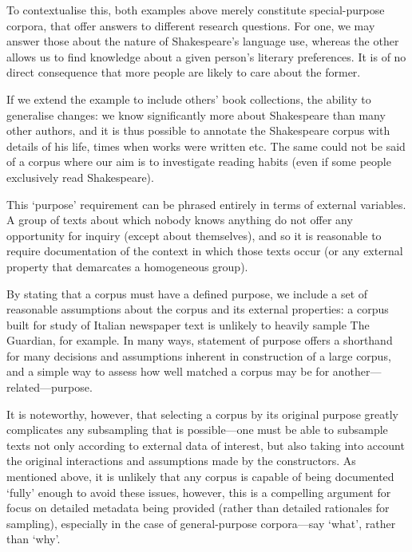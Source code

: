 To contextualise this, both examples above merely constitute special-purpose corpora, that offer answers to different research questions.  For one, we may answer those about the nature of Shakespeare's language use, whereas the other allows us to find knowledge about a given person's literary preferences.  It is of no direct consequence that more people are likely to care about the former.

If we extend the example to include others' book collections, the ability to generalise changes: we know significantly more about Shakespeare than many other authors, and it is thus possible to annotate the Shakespeare corpus with details of his life, times when works were written etc.  The same could not be said of a corpus where our aim is to investigate reading habits (even if some people exclusively read Shakespeare).

This `purpose' requirement can be phrased entirely in terms of external variables.
A group of texts about which nobody knows anything do not offer any opportunity for inquiry (except about themselves), and so it is reasonable to require documentation of the context in which those texts occur (or any external property that demarcates a homogeneous group).

By stating that a corpus must have a defined purpose, we include a set of reasonable assumptions about the corpus and its external properties: a corpus built for study of Italian newspaper text is unlikely to heavily sample The Guardian, for example.  In many ways, statement of purpose offers a shorthand for many decisions and assumptions inherent in construction of a large corpus, and a simple way to assess how well matched a corpus may be for another---related---purpose.

It is noteworthy, however, that selecting a corpus by its original purpose greatly complicates any subsampling that is possible---one must be able to subsample texts not only according to external data of interest, but also taking into account the original interactions and assumptions made by the constructors.  As mentioned above, it is unlikely that any corpus is capable of being documented `fully' enough to avoid these issues, however, this is a compelling argument for focus on detailed metadata being provided (rather than detailed rationales for sampling), especially in the case of general-purpose corpora---say `what', rather than `why'.




